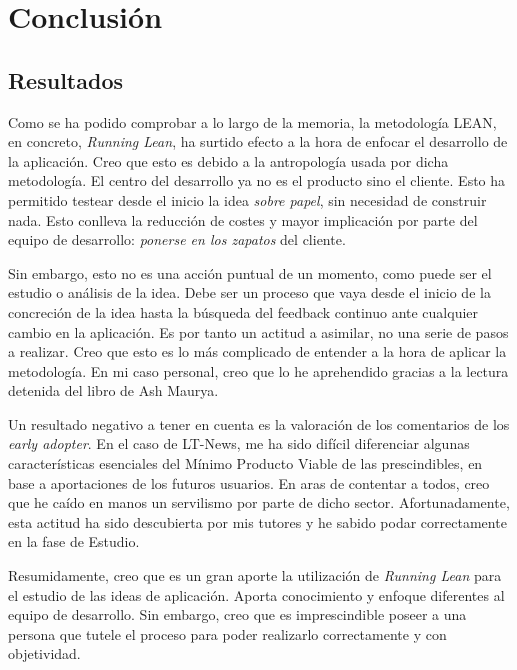 
\chapter{Conclusión}\label{conclusion}

\section{Resultados}\label{sec:resultados}

Como se ha podido comprobar a lo largo de la memoria, la metodología LEAN, en concreto, \textit{Running Lean}, ha surtido efecto a la hora de enfocar el desarrollo de la aplicación. Creo que esto es debido a la antropología usada por dicha metodología. El centro del desarrollo ya no es el producto sino el cliente. Esto ha permitido testear desde el inicio la idea \textit{sobre papel}, sin necesidad de construir nada. Esto conlleva la reducción de costes y mayor implicación por parte del equipo de desarrollo: \textit{ponerse en los zapatos} del cliente.

Sin embargo, esto no es una acción puntual de un momento, como puede ser el estudio o análisis de la idea. Debe ser un proceso que vaya desde el inicio de la concreción de la idea hasta la búsqueda del feedback continuo ante cualquier cambio en la aplicación. Es por tanto un actitud a asimilar, no una serie de pasos a realizar. Creo que esto es lo más complicado de entender a la hora de aplicar la metodología. En mi caso personal, creo que lo he aprehendido gracias a la lectura detenida del libro de Ash Maurya.

Un resultado negativo a tener en cuenta es la valoración de los comentarios de los \textit{early adopter}. En el caso de LT-News, me ha sido difícil diferenciar algunas características esenciales del Mínimo Producto Viable de las prescindibles, en base a aportaciones de los futuros usuarios. En aras de contentar a todos, creo que he caído en manos un servilismo por parte de dicho sector. Afortunadamente, esta actitud ha sido descubierta por mis tutores y he sabido podar correctamente en la fase de Estudio.

Resumidamente, creo que es un gran aporte la utilización de \textit{Running Lean} para el estudio de las ideas de aplicación. Aporta conocimiento y enfoque diferentes al equipo de desarrollo. Sin embargo, creo que es imprescindible poseer a una persona que tutele el proceso para poder realizarlo correctamente y con objetividad.

